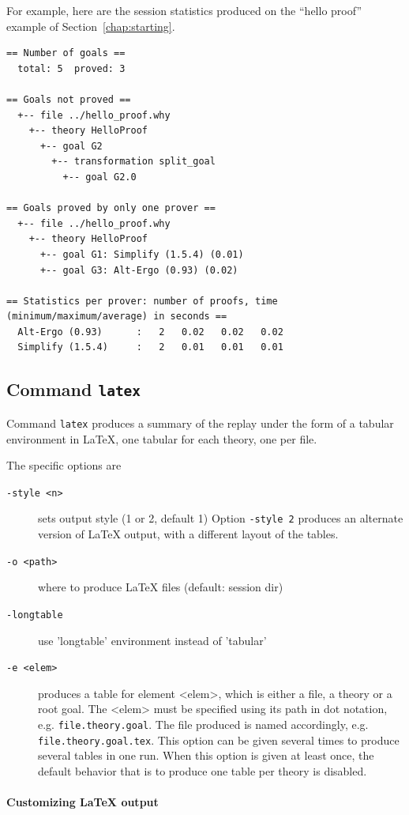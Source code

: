 For example, here are the session statistics produced on the ``hello
proof'' example of Section~\ref{chap:starting}.
{\footnotesize
\begin{verbatim}
== Number of goals ==
  total: 5  proved: 3

== Goals not proved ==
  +-- file ../hello_proof.why
    +-- theory HelloProof
      +-- goal G2
        +-- transformation split_goal
          +-- goal G2.0

== Goals proved by only one prover ==
  +-- file ../hello_proof.why
    +-- theory HelloProof
      +-- goal G1: Simplify (1.5.4) (0.01)
      +-- goal G3: Alt-Ergo (0.93) (0.02)

== Statistics per prover: number of proofs, time (minimum/maximum/average) in seconds ==
  Alt-Ergo (0.93)      :   2   0.02   0.02   0.02
  Simplify (1.5.4)     :   2   0.01   0.01   0.01
\end{verbatim}
}

\subsection{Command \texttt{latex}}

Command \texttt{latex} produces a summary of the replay under the form
of a tabular environment in LaTeX, one tabular for each theory, one
per file.

The specific options are
\begin{description}
\item[\texttt{-style <n>}] sets output style (1 or 2, default 1)
  Option \texttt{-style 2} produces an alternate version of LaTeX
  output, with a different layout of the tables.
\item[\texttt{-o <path>}] where
  to produce LaTeX files (default: session dir)
\item[\texttt{-longtable}] use 'longtable' environment instead of
  'tabular'
\item[\texttt{-e <elem>}] produces a table for element <elem>, which is
  either a file, a theory or a root goal. The <elem> must be specified
  using its path in dot notation, e.g. \verb|file.theory.goal|. The
  file produced is named accordingly,
  e.g. \verb|file.theory.goal.tex|.  This option can be given several
  times to produce several tables in one run. When this option is
  given at least once, the default behavior that is to produce one
  table per theory is disabled.
\end{description}


\paragraph{Customizing LaTeX output}

